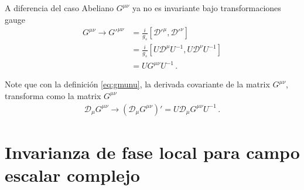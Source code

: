 A diferencia del caso Abeliano $G^{\mu\nu}$ ya no es invariante bajo transformaciones gauge
\begin{align}
G^{\mu\nu}\to    {G'}^{\mu\nu}
  &=\frac{i}{g_s}\left[{\mathcal{D}'}^\mu,{\mathcal{D}'}^\nu\right]\nonumber\\
&=\frac{i}{g_s}\left[U{\mathcal{D}}^\mu U^{-1},U{\mathcal{D}}^\nu U^{-1}\right]\nonumber\\
&=U{{G}}^{\mu\nu}U^{-1}\,.
\end{align}

Note que con la definición \eqref{eq:gmunu}, la derivada covariante de la matrix $G^{\mu\nu}$, transforma como la matrix $G^{\mu\nu}$
\begin{align}
\mathcal{D}_\mu G^{\mu\nu} \to\left(\mathcal{D}_\mu G^{\mu\nu}\right)'=U\mathcal{D}_\mu G^{\mu\nu} U^{-1}\,.
\end{align}







\section{Invarianza de fase local para campo escalar complejo}

